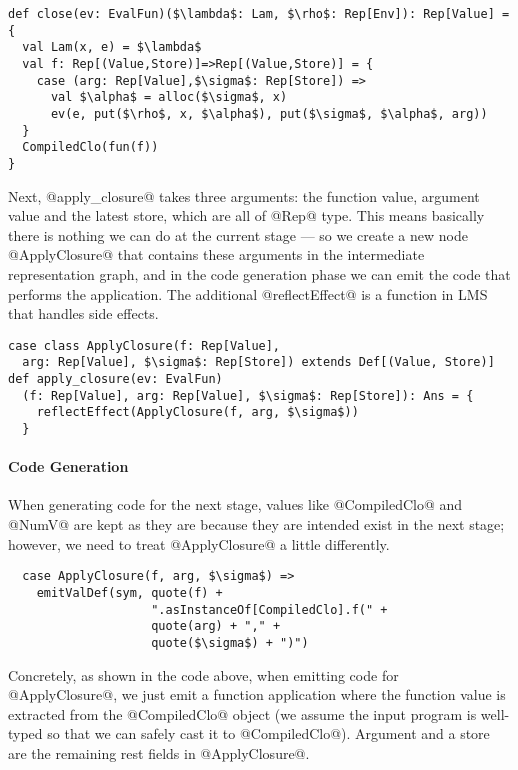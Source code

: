 \begin{lstlisting}
def close(ev: EvalFun)($\lambda$: Lam, $\rho$: Rep[Env]): Rep[Value] = {
  val Lam(x, e) = $\lambda$
  val f: Rep[(Value,Store)]=>Rep[(Value,Store)] = { 
    case (arg: Rep[Value],$\sigma$: Rep[Store]) =>
      val $\alpha$ = alloc($\sigma$, x)
      ev(e, put($\rho$, x, $\alpha$), put($\sigma$, $\alpha$, arg)) 
  }
  CompiledClo(fun(f))
}
\end{lstlisting}

Next, @apply_closure@ takes three arguments: the function value, argument value
and the latest store, which are all of @Rep@ type. This means basically there
is nothing we can do at the current stage --- so we create a new node
@ApplyClosure@ that contains these arguments in the intermediate representation
graph, and in the code generation phase we can emit the code that performs the
application. The additional @reflectEffect@ is a function in LMS that handles
side effects.

\begin{lstlisting}
case class ApplyClosure(f: Rep[Value], 
  arg: Rep[Value], $\sigma$: Rep[Store]) extends Def[(Value, Store)]
def apply_closure(ev: EvalFun)
  (f: Rep[Value], arg: Rep[Value], $\sigma$: Rep[Store]): Ans = {
    reflectEffect(ApplyClosure(f, arg, $\sigma$))
  }
\end{lstlisting}

\paragraph{Code Generation}

When generating code for the next stage, values like @CompiledClo@ and @NumV@
are kept as they are because they are intended exist in the next stage; however,
we need to treat @ApplyClosure@ a little differently.

\begin{lstlisting}
  case ApplyClosure(f, arg, $\sigma$) => 
    emitValDef(sym, quote(f) + 
                    ".asInstanceOf[CompiledClo].f(" + 
                    quote(arg) + "," + 
                    quote($\sigma$) + ")")
\end{lstlisting}

Concretely, as shown in the code above, when emitting code for @ApplyClosure@,
we just emit a function application where the function value is extracted from
the @CompiledClo@ object (we assume the input program is well-typed so that we
can safely cast it to @CompiledClo@). Argument and a store are the remaining rest
fields in @ApplyClosure@.
